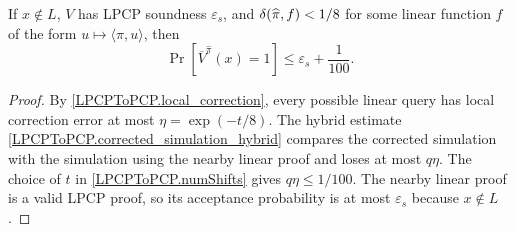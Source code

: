 \begin{lemma}
\label{LPCPToPCP.verifier_soundness_near_case}
\leanok
If \(x\notin L\), \(V\) has LPCP soundness \(\varepsilon_s\), and
\(\delta({\widehat{\pi}}, {f}) < 1/8\) for some linear function \(f\) of the form \(u\mapsto\langle\pi,u\rangle\), then
\[
  \Pr[\overline V^{\widehat{\pi}}(x)=1]\leq \varepsilon_s+\frac{1}{100}.
\]
\end{lemma}
\begin{proof}\leanok
By \ref{LPCPToPCP.local_correction}, every possible linear query has local
correction error at most \(\eta=\exp(-t/8)\). The hybrid estimate
\ref{LPCPToPCP.corrected_simulation_hybrid} compares the corrected simulation
with the simulation using the nearby linear proof and loses at most
\(q\eta\). The choice of \(t\) in \ref{LPCPToPCP.numShifts} gives
\(q\eta\le 1/100\). The nearby linear proof is a valid LPCP proof, so its
acceptance probability is at most \(\varepsilon_s\) because \(x\notin L\).



\end{proof}
